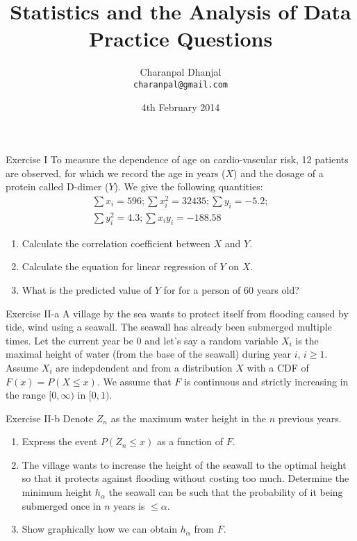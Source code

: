 \documentclass{beamer}
\title{Statistics and the Analysis of Data\\ Practice Questions}
\author{Charanpal Dhanjal \\ \texttt{charanpal@gmail.com}}
\institute{\'{E}cole des Ponts}
\date{4th February 2014}
\begin{document}
\frame{\titlepage}


\begin{frame}{Exercise I}
To measure the dependence of age on cardio-vascular risk, 12 patients are observed, for which we record the age in years ($X$) and the dosage of a protein called D-dimer ($Y$). We give the following quantities: 
\begin{eqnarray*}
\sum x_i =596; \sum x_i^2 = 32435; \sum y_i = -5.2; \\ 
 \sum y_i^2 = 4.3; \sum x_i y_i = -188.58  
\end{eqnarray*}
\begin{enumerate} 
 \item Calculate the correlation coefficient between $X$ and $Y$. 
 \item Calculate the equation for linear regression of $Y$ on $X$. 
 \item What is the predicted value of $Y$ for for a person of 60 years old? 
\end{enumerate}
\end{frame}

\begin{frame}{Exercise II-a}
A village by the sea wants to protect itself from flooding caused by tide, wind using a seawall. The seawall has already been submerged multiple times.  Let the current year be $0$ and let's say a random variable $X_i$ is the maximal height of water (from the base of the seawall) during year $i$, $i \geq 1$. Assume $X_i$ are indepdendent and from a distribution $X$ with a CDF of $F(x) = P(X \leq x)$. We assume that $F$ is continuous and strictly increasing in the range $[0, \infty)$ in $[0, 1)$. 
\end{frame}

\begin{frame}{Exercise II-b} 
Denote $Z_n$ as the maximum water height in the $n$ previous years. 
\begin{enumerate}
 \item Express the event $P(Z_n \leq x)$ as a function of $F$. 
 \item The village wants to increase the height of the seawall to the optimal height so that it protects against flooding without costing too much. Determine the minimum height $h_\alpha$ the seawall can be such that the probability of it being submerged once in $n$ years is $\leq \alpha$.  
 \item Show graphically how we can obtain $h_\alpha$ from $F$. 
\end{enumerate}
\end{frame}
\end{document}
